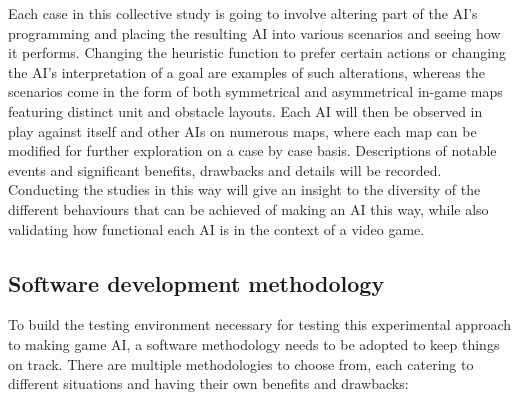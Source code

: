 \documentclass[11pt, a4paper]{report}
\begin{document}
Each case in this collective study is going to involve altering part of the AI's programming and placing the resulting AI into various scenarios and seeing how it performs. Changing the heuristic function to prefer certain actions or changing the AI's interpretation of a goal are examples of such alterations, whereas the scenarios come in the form of both symmetrical and asymmetrical in-game maps featuring distinct unit and obstacle layouts. Each AI will then be observed in play against itself and other AIs on numerous maps, where each map can be modified for further exploration on a case by case basis. Descriptions of notable events and significant benefits, drawbacks and details will be recorded. Conducting the studies in this way will give an insight to the diversity of the different behaviours that can be achieved of making an AI this way, while also validating how functional each AI is in the context of a video game.

\subsection{Software development methodology}
\label{subsec:softwareDevelopmentMethodology}

To build the testing environment necessary for testing this experimental approach to making game AI, a software methodology needs to be adopted to keep things on track. There are multiple methodologies to choose from, each catering to different situations and having their own benefits and drawbacks:
\end{document}
